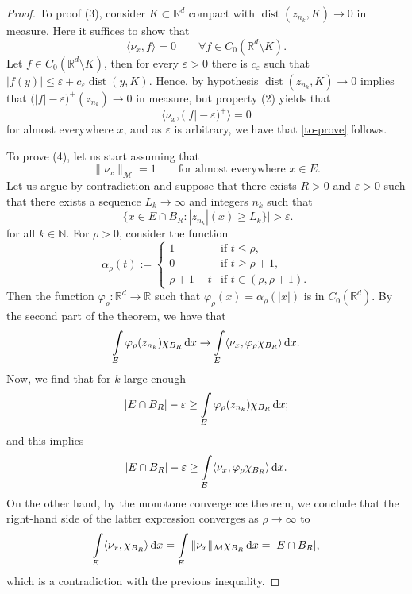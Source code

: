 \documentclass[a4paper,doc,11pt]{article}
\newcommand{\R}{\mathbb{R}}
\newcommand{\N}{\mathbb{N}}
\DeclareMathOperator{\dist}{dist}
\begin{document}
\begin{proof}
    To proof (3), consider \(K\subset \R^d\) compact with \(\dist(z_{n_k}, K) \to 0\) in measure. Here it suffices to show that
    \begin{equation}
    \label{to-prove}
        \langle \nu_x , f\rangle = 0    \qquad \forall f \in C_0(\R^d \setminus K).
    \end{equation}
    Let \(f \in C_0(\R^d \setminus K)\), then for every \( \varepsilon >0\) there is \( c_\varepsilon\) such that \( \big| f(y) \big| \leq \varepsilon + c_\varepsilon \dist(y,K) \). Hence, by hypothesis \(\dist(z_{n_k}, K) \to 0\) implies that \( \big( |f| - \varepsilon \big)^+ (z_{n_k}) \to 0 \) in measure, but property (2) yields that
    \[
        \big\langle \nu_x ,  \big( |f| - \varepsilon \big)^+ \big\rangle = 0
    \]
    for almost everywhere \(x\), and as \(\varepsilon\) is arbitrary, we have that \eqref{to-prove} follows.
    
    To prove (4), let us start assuming that
    \[
        \|\nu_x\|_{\mathcal{M}} = 1 \qquad \text{for almost everywhere } x\in E.
    \]
    Let us argue by contradiction and suppose that there exists \( R>0\) and \(\varepsilon >0 \) such that there exists a sequence \(L_k\to \infty\) and integers \(n_k\) such that
    \[
        \big| \big\{x\in E \cap B_R:  |z_{n_k}|(x) \geq L_k \big\} \big| > \varepsilon.
    \]
    for all \(k \in \N\). For \(\rho>0\), consider the function
    \[
        \alpha_\rho (t) :=
        \begin{cases}
            1   &   \text{if } t \leq \rho,
            \\
            0   &   \text{if } t \geq \rho + 1,
            \\
            \rho + 1 -t & \text{if } t \in (\rho,\rho+1).
        \end{cases}
    \]
    Then the function \(\varphi_\rho:\R^d \to\R\) such that \( \varphi_\rho(x) = \alpha_\rho(|x|)\) is in \(C_0 (\R^d)\). By the second part of the theorem, we have that
    \[
        \int\limits_E \varphi_\rho (z_{n_k}) \chi_{B_R} \dif x
        \to
        \int\limits_E \langle \nu_x, \varphi_\rho \chi_{B_R}\rangle \dif x.
    \]
    Now, we find that for \(k\) large enough
    \[
        |E\cap B_R| - \varepsilon \geq \int\limits_E \varphi_\rho (z_{n_k}) \chi_{B_R} \dif x;
    \]
    and this implies
    \[
        |E\cap B_R| - \varepsilon \geq \int\limits_E \langle \nu_x, \varphi_\rho \chi_{B_R}\rangle \dif x.
    \]
    On the other hand, by the monotone convergence theorem, we conclude that the right-hand side of the latter expression converges as \(\rho\to \infty\) to 
    \[
        \int\limits_E \langle \nu_x, \chi_{B_R}\rangle \dif x
        =
        \int\limits_E \|\nu_x\|_{\mathcal{M}} \chi_{B_R} \dif x = |E \cap B_R|,
    \]
    which is a contradiction with the previous inequality.
    

\end{proof}
\end{document}
